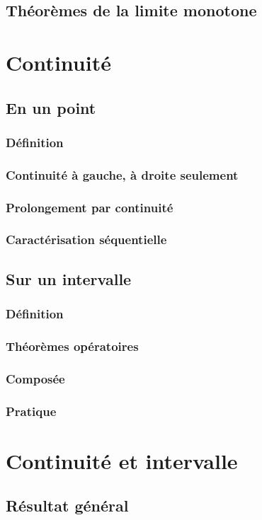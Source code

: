 \documentclass[12pt,a4paper,french]{book}
\begin{document}
		\subsection{Théorèmes de la limite monotone}
	\section{Continuité}
		\subsection{En un point}
			\subsubsection{Définition}
			\subsubsection{Continuité à gauche, à droite seulement}
			\subsubsection{Prolongement par continuité}
			\subsubsection{Caractérisation séquentielle}
		\subsection{Sur un intervalle}
			\subsubsection{Définition}
			\subsubsection{Théorèmes opératoires}
			\subsubsection{Composée}
			\subsubsection{Pratique}
	\section{Continuité et intervalle}
		\subsection{Résultat général}
\end{document}
